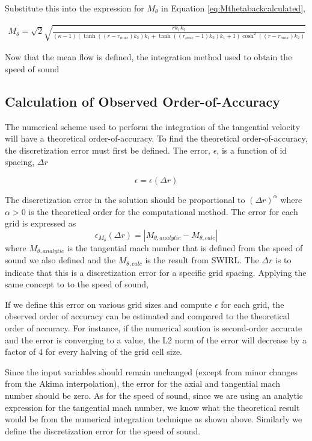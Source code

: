 \documentclass[12pt]{article}
\begin{document}
Substitute this into the expression for $M_{\theta}$ in Equation 
\ref{eq:Mthetabackcalculated},

\begin{align*}
    M_{\theta} = \sqrt{2}
    \sqrt{\frac{r {k}_{1} {k}_{2}}{\left(\kappa - 1\right) \left(\tanh{\left(\left(r - r_{max}\right) {k}_{2} \right)} {k}_{1} + \tanh{\left(\left(r_{max} - 1\right) {k}_{2} \right)} {k}_{1} + 1\right) \cosh^{2}{\left(\left(r - r_{max}\right) {k}_{2} \right)}}}
\end{align*} 

Now that the mean flow is defined, the integration method used to obtain the 
speed of sound


\subsection{Calculation of Observed Order-of-Accuracy}
The numerical scheme used to perform the integration of the tangential velocity
will have a theoretical order-of-accuracy. To find the theoretical 
order-of-accuracy, the discretization error must first be defined. The error, 
$\epsilon$, is a function of id spacing, $\Delta r$

\[ \epsilon = \epsilon(\Delta r) \]

The discretization error in the solution should be proportional to 
$\left( \Delta r \right)^{\alpha}$ where $\alpha > 0$ is the theoretical order
for the computational method.  The error for each grid is expressed as 
\[ \epsilon_{M_{\theta}}(\Delta r) = |M_{\theta,analytic}-M_{\theta,calc}|\]
where $M_{\theta,analytic}$ is the tangential mach number that is defined from the
speed of sound we also defined and the $M_{\theta,calc}$ is the result from 
SWIRL. The $\Delta r$ is to indicate that this is a discretization error for a
specific grid spacing. Applying the same concept to to the speed of sound,

If we define this error on various grid sizes and compute $\epsilon$ for
each grid, the observed order of accuracy can be estimated and compared to
the theoretical order of accuracy. For instance, if the numerical soution
is second-order accurate and the error is converging to a value, the L2 norm of
the error will decrease by a factor of 4 for every halving of the grid cell 
size. 

Since the input variables should remain unchanged (except from minor changes 
from the Akima interpolation), the error for the axial and tangential mach 
number should be zero. As for the speed of sound, since we are using an analytic
expression for the tangential mach number, we know what the theoretical result
would be from the numerical integration technique as shown above. 
Similarly we define the discretization error for the speed of sound.
\end{document}
